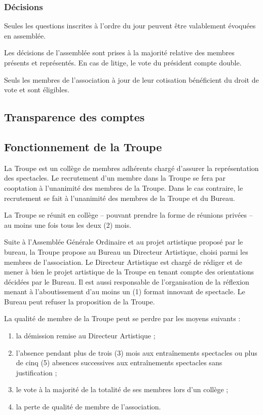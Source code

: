 \documentclass[a4paper,french,10pt]{article}
\begin{document}
\subsubsection{Décisions}
\label{sec:decisions}

Seules les questions inscrites à l’ordre du jour peuvent être
valablement évoquées en assemblée.

Les décisions de l’assemblée sont prises à la majorité relative des
membres présents et représentés. En cas de litige, le vote du
président compte double.

Seuls les membres de l’association à jour de leur cotisation
bénéficient du droit de vote et sont éligibles.

\subsection{Transparence des comptes}
\label{sec:transp-des-compt}

\subsection{Fonctionnement de la Troupe}
\label{sec:fonctionnement-troupe}
La Troupe est un collège de membres adhérents chargé d'assurer la représentation des spectacles. Le recrutement d'un membre dans la Troupe se fera par cooptation à l'unanimité des membres de la Troupe.
Dans le cas contraire, le recrutement se fait à l'unanimité des membres de la Troupe et du Bureau.

 La Troupe se réunit en collège -- pouvant prendre la forme de réunions privées -- au moins une fois tous les deux (2) mois.

Suite à l'Assemblée Générale Ordinaire et au projet artistique proposé par le bureau, la Troupe propose au Bureau un Directeur Artistique, choisi parmi les membres de l'association. Le Directeur Artistique est chargé de rédiger et de mener à bien le projet artistique de la Troupe en tenant compte des orientations décidées par le Bureau. Il est aussi responsable de l'organisation de la réflexion menant à l'aboutissement d'au moins un (1) format innovant de spectacle. Le Bureau peut refuser la proposition de la Troupe. 

La qualité de membre de la Troupe peut se perdre par les moyens suivants :

\begin{enumerate}
	\item la démission remise au Directeur Artistique ;
	\item l'absence pendant plus de trois  (3) mois aux entraînements spectacles ou plus de cinq (5) absences successives aux entraînements spectacles sans justification ;
	\item le vote à la majorité de la totalité de ses membres lors d'un collège ;
	\item la perte de qualité de membre de l'association.

\end{enumerate}
\end{document}
